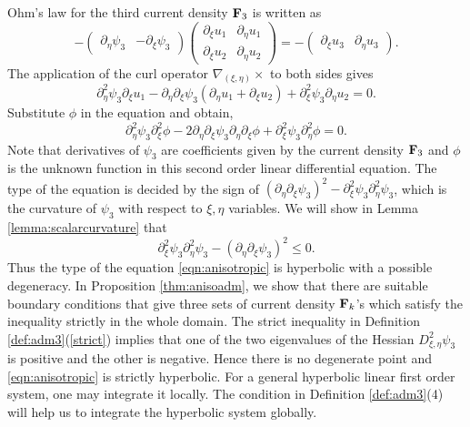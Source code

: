 \documentclass[11pt]{amsart}
\theoremstyle{plain}
\numberwithin{equation}{section}
\numberwithin{Thm}{section}
\def\F{{\bf F}}
\begin{document}
Ohm's law for the third current density $\F_3$ is written as
$$
-\begin{pmatrix} \partial_\eta\psi_3 & -\partial_\xi\psi_3 \end{pmatrix}
\begin{pmatrix} \partial_\xi u_1 & \partial_\eta u_1 \\ \partial_\xi u_2 & \partial_\eta u_2\end{pmatrix}
= -\begin{pmatrix} \partial_\xi u_3 & \partial_\eta u_3 \end{pmatrix}.
$$
The application of the curl operator $\nabla_{(\xi,\eta)} \times$ to both sides gives
$$
\partial_\eta^2\psi_3\partial_\xi u_1 -\partial_\eta\partial_\xi\psi_3(\partial_\eta u_1 + \partial_\xi u_2) + \partial_\xi^2\psi_3 \partial_\eta u_2=0.
$$
Substitute $\phi$ in the equation and obtain,
\begin{equation}
  \partial_\eta^2\psi_3\partial^2_{\xi}\phi -2\partial_\eta\partial_\xi\psi_3\partial_\eta\partial_\xi\phi + \partial_\xi^2\psi_3 \partial^2_{\eta} \phi=0. \label{eqn:anisotropic}
\end{equation}
Note that derivatives of $\psi_3$ are coefficients given by the current density $\F_3$ and $\phi$ is the unknown function in this second order linear differential equation. The type of the equation is decided by the sign of $(\partial_\eta\partial_\xi\psi_3)^2 - \partial_\xi^2\psi_3\partial_\eta^2\psi_3$, which is the curvature of $\psi_3$ with respect to $\xi,\eta$ variables. We will show in Lemma \ref{lemma:scalarcurvature} that
$$\partial_\xi^2\psi_3\partial_\eta^2\psi_3 - (\partial_\eta\partial_\xi\psi_3)^2 \le 0.$$
Thus the type of the equation \eqref{eqn:anisotropic} is hyperbolic with a possible degeneracy. In Proposition \ref{thm:anisoadm}, we show that there are suitable boundary conditions that give three sets of current density $\F_k$'s which satisfy the inequality strictly in the whole domain. The strict inequality in Definition \ref{def:adm3}(\ref{strict}) implies that one of the two eigenvalues of the Hessian $D^2_{\xi,\eta}\psi_3$ is positive and the other is negative. Hence there is no degenerate point and \eqref{eqn:anisotropic} is strictly hyperbolic. For a general hyperbolic linear first order system, one may integrate it locally. The condition in Definition \ref{def:adm3}(4) will help us to integrate the hyperbolic system globally.
\end{document}
